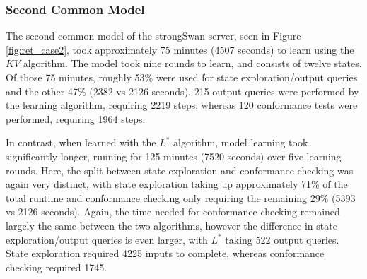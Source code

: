 \subsubsection*{Second Common Model}

The second common model of the strongSwan server, seen in Figure \ref{fig:ret_case2}, took approximately 75 minutes (4507 seconds) to learn using the $KV$ algorithm. The model took nine rounds to learn, and consists of twelve states. Of those 75 minutes, roughly 53\% were used for state exploration/output queries and the other 47\% (2382 vs 2126 seconds). 215 output queries were performed by the learning algorithm, requiring 2219 steps, whereas 120 conformance tests were performed, requiring 1964 steps. 

In contrast, when learned with the $L^*$ algorithm, model learning took significantly longer, running for 125 minutes (7520 seconds) over five learning rounds. Here, the split between state exploration and conformance checking was again very distinct, with state exploration taking up approximately 71\% of the total runtime and conformance checking only requiring the remaining 29\% (5393 vs 2126 seconds). Again, the time needed for conformance checking remained largely the same between the two algorithms, however the difference in state exploration/output queries is even larger, with $L^*$ taking 522 output queries. State exploration required 4225 inputs to complete, whereas conformance checking required 1745.

